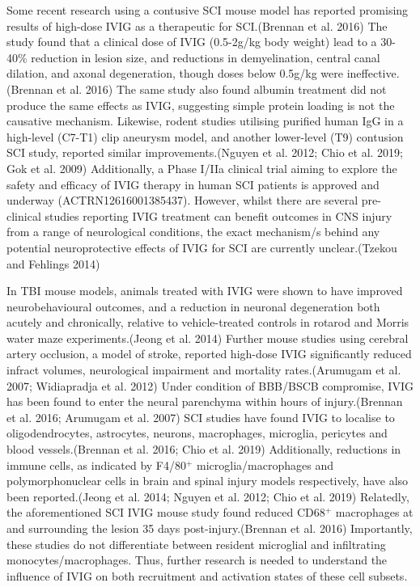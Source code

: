 \documentclass[9pt,lineno]{elife}
\begin{document}
Some recent research using a contusive SCI mouse model has reported promising results of high-dose IVIG as a therapeutic for SCI.(Brennan et al. 2016)
The study found that a clinical dose of IVIG (0.5-2g/kg body weight) lead to a 30-40\% reduction in lesion size, and reductions in demyelination, central canal dilation, and axonal degeneration, though doses below 0.5g/kg were ineffective.(Brennan et al. 2016)
The same study also found albumin treatment did not produce the same effects as IVIG, suggesting simple protein loading is not the causative mechanism.
Likewise, rodent studies utilising purified human IgG in a high-level (C7-T1) clip aneurysm model, and another lower-level (T9) contusion SCI study, reported similar improvements.(Nguyen et al. 2012; Chio et al. 2019; Gok et al. 2009)
Additionally, a Phase I/IIa clinical trial aiming to explore the safety and efficacy of IVIG therapy in human SCI patients is approved and underway (ACTRN12616001385437).
However, whilst there are several pre-clinical studies reporting IVIG treatment can benefit outcomes in CNS injury from a range of neurological conditions, the exact mechanism/s behind any potential neuroprotective effects of IVIG for SCI are currently unclear.(Tzekou and Fehlings 2014)

In TBI mouse models, animals treated with IVIG were shown to have improved neurobehavioural outcomes, and a reduction in neuronal degeneration both acutely and chronically, relative to vehicle-treated controls in rotarod and Morris water maze experiments.(Jeong et al. 2014)
Further mouse studies using cerebral artery occlusion, a model of stroke, reported high-dose IVIG significantly reduced infract volumes, neurological impairment and mortality rates.(Arumugam et al. 2007; Widiapradja et al. 2012)
Under condition of BBB/BSCB compromise, IVIG has been found to enter the neural parenchyma within hours of injury.(Brennan et al. 2016; Arumugam et al. 2007)
SCI studies have found IVIG to localise to oligodendrocytes, astrocytes, neurons, macrophages, microglia, pericytes and blood vessels.(Brennan et al. 2016; Chio et al. 2019)
Additionally, reductions in immune cells, as indicated by F4/80\(^+\) microglia/macrophages and polymorphonuclear cells in brain and spinal injury models respectively, have also been reported.(Jeong et al. 2014; Nguyen et al. 2012; Chio et al. 2019)
Relatedly, the aforementioned SCI IVIG mouse study found reduced CD68\(^+\) macrophages at and surrounding the lesion 35 days post-injury.(Brennan et al. 2016)
Importantly, these studies do not differentiate between resident microglial and infiltrating monocytes/macrophages.
Thus, further research is needed to understand the influence of IVIG on both recruitment and activation states of these cell subsets.
\end{document}
